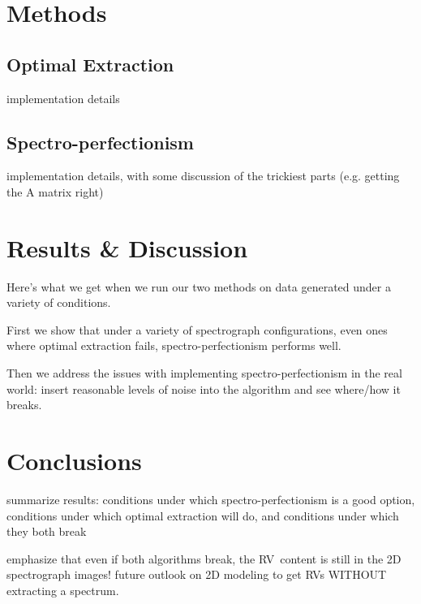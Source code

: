 \documentclass[modern]{aastex61}
\newcommand{\acronym}[1]{{\small{#1}}}
\newcommand{\RV}{\acronym{RV}}
\begin{document}
\section{Methods}
\subsection{Optimal Extraction}
implementation details

\subsection{Spectro-perfectionism}
implementation details, with some discussion of the trickiest parts (e.g. getting the A matrix right)

\section{Results \& Discussion}
Here's what we get when we run our two methods on data generated under a variety of conditions.

First we show that under a variety of spectrograph configurations, even ones where optimal extraction fails, spectro-perfectionism performs well.

Then we address the issues with implementing spectro-perfectionism in the real world: insert reasonable levels of noise into the algorithm and see where/how it breaks.

\section{Conclusions}

summarize results: conditions under which spectro-perfectionism is a good option, conditions under which optimal extraction will do, and conditions under which they both break

emphasize that even if both algorithms break, the \RV\ content is still in the 2D spectrograph images! future outlook on 2D modeling to get \RV s WITHOUT extracting a spectrum.




\end{document}

